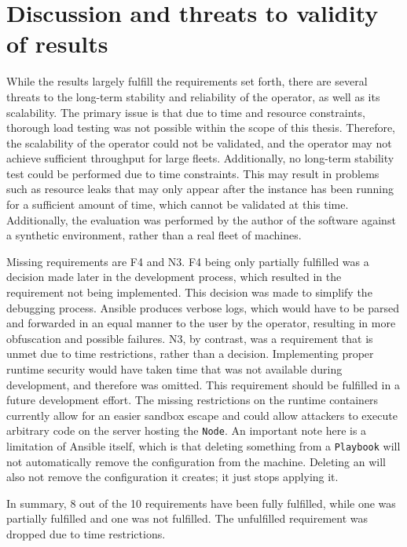 \section{Discussion and threats to validity of results}
While the results largely fulfill the requirements set forth, there are several threats to the long-term stability and reliability of the operator, as well as its scalability.
The primary issue is that due to time and resource constraints, thorough load testing was not possible within the scope of this thesis. Therefore, the scalability of the operator could not be validated, and the operator may not achieve sufficient throughput for large fleets.
Additionally, no long-term stability test could be performed due to time constraints. This may result in problems such as resource leaks that may only appear after the instance has been running for a sufficient amount of time, which cannot be validated at this time.
Additionally, the evaluation was performed by the author of the software against a synthetic environment, rather than a real fleet of machines.

Missing requirements are F4 and N3. F4 being only partially fulfilled was a decision made later in the development process, which resulted in the requirement not being implemented.
This decision was made to simplify the debugging process.
Ansible produces verbose logs, which would have to be parsed and forwarded in an equal manner to the user by the operator, resulting in more obfuscation and possible failures.
N3, by contrast, was a requirement that is unmet due to time restrictions, rather than a decision.
Implementing proper runtime security would have taken time that was not available during development, and therefore was omitted.
This requirement should be fulfilled in a future development effort.
The missing restrictions on the runtime containers currently allow for an easier sandbox escape and could allow attackers to execute arbitrary code on the server hosting the \texttt{Node}.
An important note here is a limitation of Ansible itself, which is that deleting something from a \texttt{Playbook} will not automatically remove the configuration from the machine.
Deleting an \anrecjob will also not remove the configuration it creates; it just stops applying it.

In summary, 8 out of the 10 requirements have been fully fulfilled, while one was partially fulfilled and one was not fulfilled.
The unfulfilled requirement was dropped due to time restrictions.

